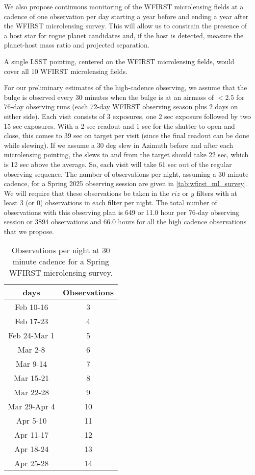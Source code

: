 We also propose continuous monitoring of the WFIRST microlensing fields
at a cadence of one observation per day
starting a year before and ending a year after the WFIRST microlensing survey.
This will allow us to constrain the presence of a host star for rogue planet candidates and,
if the host is detected, measure the planet-host mass ratio and projected separation.

A single LSST pointing, centered on the WFIRST microlensing
fields, would cover all 10 WFIRST microlensing fields.

For our preliminary estimates of the high-cadence observing, we assume
that the bulge is observed every 30 minutes when the bulge is at
an airmass of $< 2.5$ for 76-day observing runs (each 72-day WFIRST observing
season plus 2 days on either side). Each visit consists of 3 exposures,
one 2 sec exposure followed by two 15 sec exposures. With a 2 sec readout
and 1 sec for the shutter to open and close, this comes to 39 sec on target
per visit (since the final readout can be done while slewing).
If we assume a 30 deg slew in Azimuth before and after each microlensing pointing, the slews
to and from the target should take 22 sec, which is 12 sec above the average. So,
each visit will take 61 sec out of the regular observing sequence.
The number of observations per night, assuming a 30 minute cadence, for
a Spring 2025 observing session are given in \autoref{tab:wfirst_ml_survey}. We will require
that these observations be taken in the $riz$ or $y$ filters with at
least 3 (or 0) observations in each filter per night. The total number
of observations with this observing plan is 649 or 11.0 hour per
76-day observing session or 3894 observations and 66.0 hours for
all the high cadence observations that we propose.

\begin{table}
\begin{tabular}{ c c }
{\bf days} & {\bf Observations} \\
\hline
Feb 10-16     &  3 \\
Feb 17-23     &  4 \\
Feb 24-Mar 1  &  5 \\
Mar 2-8       &  6 \\
Mar 9-14      &  7 \\
Mar 15-21     &  8 \\
Mar 22-28     &  9 \\
Mar 29-Apr 4  & 10 \\
Apr 5-10      & 11 \\
Apr 11-17     & 12 \\
Apr 18-24     & 13 \\
Apr 25-28     & 14 \\
\end{tabular}
\caption{Observations per night at 30 minute cadence for a Spring
WFIRST microlensing survey.}
\label{tab:wfirst_ml_survey}
\end{table}

